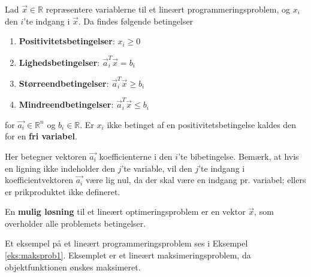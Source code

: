 \begin{defn}[Bibetingelser]
Lad $\vec{x}\in \mathds{R}$ repræsentere variablerne til et lineært programmeringsproblem, og $x_i$ den $i$'te indgang i $\vec{x}$. Da findes følgende betingelser
\begin{enumerate}
\item \textbf{Positivitetsbetingelser}: $x_i \geq 0$
\item \textbf{Lighedsbetingelser}: $\vec{a}_i^T\vec{x} = b_i$
\item \textbf{Størreendbetingelser}: $\vec{a}_i^T\vec{x} \geq b_i$
\item \textbf{Mindreendbetingelser}: $\vec{a}_i^T\vec{x} \leq b_i$
\end{enumerate}
for $\vec{a_i}\in \mathds{R}^n$ og $b_i\in \mathds{R}$. 
Er $x_i$ ikke betinget af en positivitetsbetingelse kaldes den for en \textbf{fri variabel}.
\end{defn}
Her betegner vektoren $\vec{a_i}$ koefficienterne i den $i$'te bibetingelse. Bemærk, at hvis en ligning ikke indeholder den $j$'te variable, vil den $j$'te indgang i koefficientvektoren $\vec{a_i}$ være lig nul, da der skal være en indgang pr. variabel; ellers er prikproduktet ikke defineret.

En \textbf{mulig løsning} til et lineært optimeringsproblem er en vektor $\vec{x}$, som overholder alle problemets betingelser. %

Et eksempel på et lineært programmeringsproblem ses i Eksempel \ref{eks:maksprob1}. Eksemplet er et lineært maksimeringsproblem, da objektfunktionen ønskes maksimeret.

